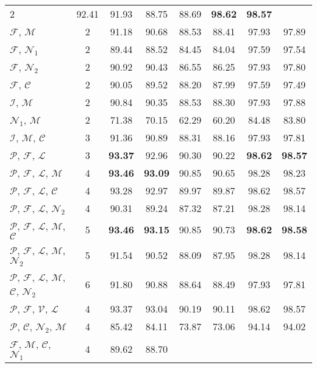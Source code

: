 \documentclass{llncs}
\begin{document}
\begin{table*}[htb]
\begin{tabular}{l c c c c c c c}
2 & 92.41 & 91.93 & 88.75 & 88.69 & \textbf{98.62} & \textbf{98.57} \\ $\mathcal{F}$,
$\mathcal{M}$ & 2 & 91.18 & 90.68 & 88.53 & 88.41 & 97.93 & 97.89 \\
$\mathcal{F}$, $\mathcal{N}_1$ & 2 & 89.44 & 88.52 & 84.45 & 84.04 & 97.59 &
97.54 \\ $\mathcal{F}$, $\mathcal{N}_2$ & 2 & 90.92 & 90.43 & 86.55 & 86.25 &
97.93 & 97.80 \\ $\mathcal{F}$, $\mathcal{C}$ & 2 & 90.05 & 89.52 & 88.20 &
87.99 & 97.59 & 97.49 \\ $\mathcal{I}$, $\mathcal{M}$ & 2 & 90.84 & 90.35 &
88.53 & 88.30 & 97.93 & 97.88 \\ $\mathcal{N}_1$, $\mathcal{M}$ & 2 & 71.38 &
70.15 & 62.29 & 60.20 & 84.48 & 83.80 \\ $\mathcal{I}$, $\mathcal{M}$,
$\mathcal{C}$ & 3 & 91.36 & 90.89 & 88.31 & 88.16 & 97.93 & 97.81 \\
$\mathcal{P}$, $\mathcal{F}$, $\mathcal{L}$ & 3 & \textbf{93.37} & 92.96 & 90.30
& 90.22 & \textbf{98.62} & \textbf{98.57} \\ $\mathcal{P}$, $\mathcal{F}$, $\mathcal{L}$,
$\mathcal{M}$ & 4 & \textbf{93.46} & \textbf{93.09} & 90.85 & 90.65 & 98.28 &
98.23 \\ $\mathcal{P}$, $\mathcal{F}$, $\mathcal{L}$, $\mathcal{C}$ & 4 & 93.28
& 92.97 & 89.97 & 89.87 & 98.62 & 98.57 \\ $\mathcal{P}$, $\mathcal{F}$,
$\mathcal{L}$, $\mathcal{N}_2$ & 4 & 90.31 & 89.24 & 87.32 & 87.21 & 98.28 &
98.14 \\ $\mathcal{P}$, $\mathcal{F}$, $\mathcal{L}$, $\mathcal{M}$,
$\mathcal{C}$ & 5 & \textbf{93.46} & \textbf{93.15} & 90.85 & 90.73 & \textbf{98.62} &
\textbf{98.58} \\ $\mathcal{P}$, $\mathcal{F}$, $\mathcal{L}$, $\mathcal{M}$,
$\mathcal{N}_2$ & 5 & 91.54 & 90.52 & 88.09 & 87.95 & 98.28 & 98.14 \\
$\mathcal{P}$, $\mathcal{F}$, $\mathcal{L}$, $\mathcal{M}$, $\mathcal{C}$,
$\mathcal{N}_2$ & 6 & 91.80 & 90.88 & 88.64 & 88.49 & 97.93 & 97.81 \\
$\mathcal{P}$, $\mathcal{F}$, $\mathcal{V}$, $\mathcal{L}$ & 4 & 93.37 & 93.04 &
90.19 & 90.11 & 98.62 & 98.57 \\ $\mathcal{P}$, $\mathcal{C}$, $\mathcal{N}_2$,
$\mathcal{M}$ & 4 & 85.42 & 84.11 & 73.87 & 73.06 & 94.14 & 94.02 \\
$\mathcal{F}$, $\mathcal{M}$, $\mathcal{C}$, $\mathcal{N}_1$ & 4 & 89.62 & 88.70

\end{tabular}
\end{table*}
\end{document}
